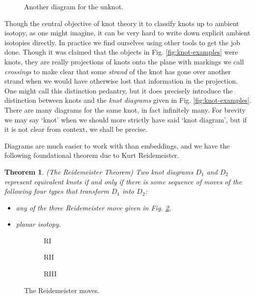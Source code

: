 \documentclass[12pt]{report}
\newtheorem*{theorem}{Theorem}
\begin{document}
\begin{figure}[hbt]
	\centering
	\def\svgscale{0.2}
	
	\caption{Another diagram for the unknot.}
	\label{fig:unknot_twisted}
\end{figure}

Though the central objective of knot theory it to classify knots up to ambient isotopy, as one might imagine, it can be very hard to write down explicit ambient isotopies directly. In practice we find ourselves using other tools to get the job done. Though it was claimed that the objects in Fig. \ref{fig:knot-examples} were knots, they are really projections of knots onto the plane with markings we call \textit{crossings} to make clear that some \textit{strand} of the knot has gone over another strand when we would have otherwise lost that information in the projection. One might call this distinction pedantry, but it does precisely introduce the distinction between knots and the \textit{knot diagrams} given in Fig. \ref{fig:knot-examples}. There are many diagrams for the same knot, in fact infinitely many. For brevity we may say `knot' when we should more strictly have said `knot diagram', but if it is not clear from context, we shall be precise.

Diagrams are much easier to work with than embeddings, and we have the following foundational theorem due to Kurt Reidemeister.
\begin{theorem}(The Reidemeister Theorem)
Two knot diagrams $D_{1}$ and $D_{2}$ represent equivalent knots if and only if there is some sequence of moves of the following four types that transform $D_{1}$ into $D_{2}$:
\begin{itemize}
	\item any of the three Reidemeister move given in Fig. \ref{fig:reidemeister_moves},
	\item planar isotopy.
\end{itemize}
\end{theorem}

\begin{figure}[H]
	\centering
	\hfill
	\begin{subfigure}[b]{0.31 \textwidth}
		\centering
		\def\svgscale{0.19}
		
		\caption{RI}
	\end{subfigure}
	\hfill
	\begin{subfigure}[b]{0.31 \textwidth}
		\centering
		\def\svgscale{0.19}
		
		\caption{RII}
	\end{subfigure}
	\hfill
	\begin{subfigure}[b]{0.31 \textwidth}
		\centering
		\def\svgscale{0.19}
		
		\caption{RIII}
	\end{subfigure}
	\caption{The Reidemeister moves.}
	\label{fig:reidemeister_moves}
	\hfill \phantom{1}
\end{figure}
\end{document}
